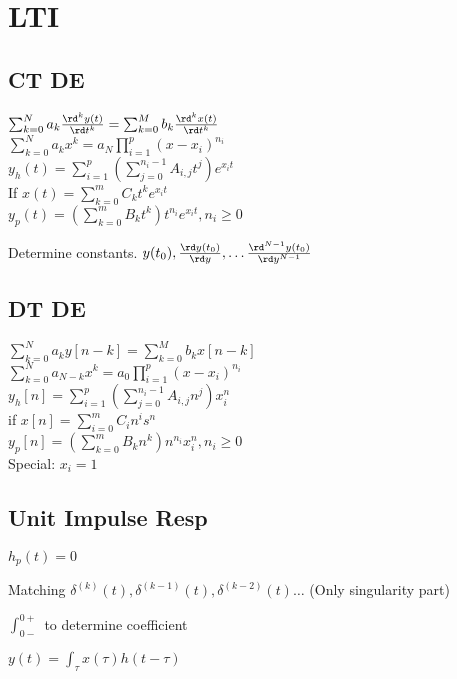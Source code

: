 \section{LTI}
\subsection*{CT DE}
$\sum_{k=0}^{N}a_k\frac{\rd^k y(t)}{\rd t^k}=\sum_{k=0}^{M} b_k\frac{\rd^k x(t)}{\rd t^k}$\\
$\sum_{k=0}^{N} a_k x^k = a_N \prod_{i=1}^p (x-x_i)^{n_i}$\\
$y_h(t) = \sum_{i=1}^{p} (\sum_{j=0}^{n_i-1} A_{i,j} t^j) e^{x_it}$\\
If $x(t)=\sum_{k=0}^{m} C_kt^ke^{x_i t}$\\
$y_p(t)=(\sum_{k=0}^{m} B_kt^k)t^{n_i} e^{x_it}, n_i\ge 0$

Determine constants. $y(t_0), \frac{\rd y(t_0)}{\rd y}, \ldots \frac{\rd^{N-1} y(t_0)}{\rd y^{N-1}}$
\subsection*{DT DE}
$\sum_{k=0}^{N} a_k y[n-k] = \sum_{k=0}^{M} b_k x[n-k]$\\ 
$\sum_{k=0}^N a_{N-k} x^k = a_0\prod_{i=1}^p (x-x_i)^{n_i}$\\
$y_h[n] = \sum_{i=1}^{p} (\sum_{j=0}^{n_i-1} A_{i,j} n^j) x_i^{n}$\\
if $x[n] = \sum_{i=0}^m C_i n^i s^n$\\
$y_p[n]=(\sum_{k=0}^{m} B_kn^k)n^{n_i}x_i^n , n_i\ge 0$\\
Special: $x_i=1$
\subsection*{Unit Impulse Resp}

$h_p(t) = 0$

Matching $\delta^{(k)}(t), \delta^{(k-1)}(t), \delta^{(k-2)}(t)
\ldots$ (Only singularity part)

$\int_{0-}^{0+}$ to determine coefficient

$y(t)=\int_{\tau} x(\tau)  h(t-\tau)$

